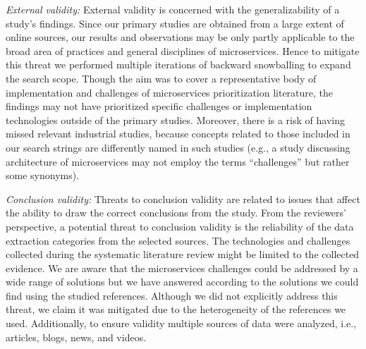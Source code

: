 \par \textit{External validity:}
External validity is concerned with the generalizability of a study’s
findings.\cite{Kitchenham2007} Since our primary studies are obtained from a large extent of online sources, our results and observations may be only partly applicable to the broad area of practices and general disciplines of microservices. Hence to mitigate this threat we performed multiple iterations of backward snowballing to expand the search scope.
%
Though the aim was to
cover a representative body of implementation and challenges of microservices prioritization literature, the findings may not have prioritized specific challenges or implementation technologies outside of the primary studies. 
Moreover, there is a risk of having missed relevant industrial studies, because concepts related to those included in our search strings are differently named in such studies (e.g., a study discussing architecture of microservices may not employ the terms “challenges” but rather some synonyms). %



\par \textit{Conclusion validity:} 
Threats to conclusion validity are related to issues that affect the ability to draw the correct conclusions from the study.\cite{Kitchenham2007} From the reviewers’ perspective, a potential threat to conclusion validity is the reliability of the data extraction categories from the selected sources. The technologies and challenges collected during the systematic literature review might be limited to the collected evidence. We are aware that the microservices challenges could be addressed by a wide range of solutions but we have answered according to the solutions we could find using the studied references. Although we did not explicitly address this threat, we claim it was mitigated due to the heterogeneity of the references we used. Additionally, to ensure validity multiple sources of data were analyzed, i.e., articles, blogs, news, and videos. %

